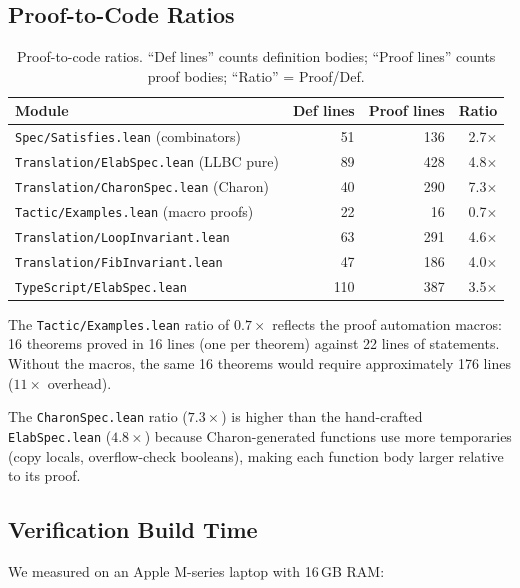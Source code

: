 \subsection{Proof-to-Code Ratios}

\begin{table}[t]
\centering
\caption{Proof-to-code ratios. ``Def lines'' counts definition bodies;
         ``Proof lines'' counts proof bodies; ``Ratio'' = Proof/Def.}
\label{tab:ratios}
\small
\begin{tabular}{@{}lrrr@{}}
\toprule
\textbf{Module} & \textbf{Def lines} & \textbf{Proof lines} & \textbf{Ratio} \\
\midrule
\texttt{Spec/Satisfies.lean} (combinators)      &  51 & 136 & 2.7$\times$ \\
\texttt{Translation/ElabSpec.lean} (LLBC pure)  &  89 & 428 & 4.8$\times$ \\
\texttt{Translation/CharonSpec.lean} (Charon)   &  40 & 290 & 7.3$\times$ \\
\texttt{Tactic/Examples.lean} (macro proofs)    &  22 &  16 & 0.7$\times$ \\
\texttt{Translation/LoopInvariant.lean}         &  63 & 291 & 4.6$\times$ \\
\texttt{Translation/FibInvariant.lean}          &  47 & 186 & 4.0$\times$ \\
\texttt{TypeScript/ElabSpec.lean}               & 110 & 387 & 3.5$\times$ \\
\bottomrule
\end{tabular}
\end{table}

The \texttt{Tactic/Examples.lean} ratio of $0.7{\times}$ reflects the
proof automation macros: 16 theorems proved in 16 lines (one per theorem)
against 22 lines of statements. Without the macros, the same 16 theorems
would require approximately 176 lines ($11{\times}$ overhead).

The \texttt{CharonSpec.lean} ratio ($7.3{\times}$) is higher than the
hand-crafted \texttt{ElabSpec.lean} ($4.8{\times}$) because Charon-generated
functions use more temporaries (copy locals, overflow-check booleans), making
each function body larger relative to its proof.

\subsection{Verification Build Time}

We measured  on an Apple M-series laptop
with 16\,GB RAM:


